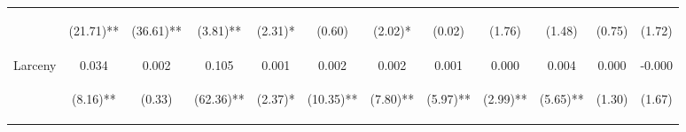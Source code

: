 \begin{tabular}{lccccccccccc}
 & \begin{footnotesize}(21.71)**\end{footnotesize} & \begin{footnotesize}(36.61)**\end{footnotesize} & \begin{footnotesize}(3.81)**\end{footnotesize} & \begin{footnotesize}(2.31)*\end{footnotesize} & \begin{footnotesize}(0.60)\end{footnotesize} & \begin{footnotesize}(2.02)*\end{footnotesize} & \begin{footnotesize}(0.02)\end{footnotesize} & \begin{footnotesize}(1.76)\end{footnotesize} & \begin{footnotesize}(1.48)\end{footnotesize} & \begin{footnotesize}(0.75)\end{footnotesize} & \begin{footnotesize}(1.72)\end{footnotesize}\\
\noalign{\smallskip}Larceny & 0.034 & 0.002 & 0.105 & 0.001 & 0.002 & 0.002 & 0.001 & 0.000 & 0.004 & 0.000 & -0.000\\
 & \begin{footnotesize}(8.16)**\end{footnotesize} & \begin{footnotesize}(0.33)\end{footnotesize} & \begin{footnotesize}(62.36)**\end{footnotesize} & \begin{footnotesize}(2.37)*\end{footnotesize} & \begin{footnotesize}(10.35)**\end{footnotesize} & \begin{footnotesize}(7.80)**\end{footnotesize} & \begin{footnotesize}(5.97)**\end{footnotesize} & \begin{footnotesize}(2.99)**\end{footnotesize} & \begin{footnotesize}(5.65)**\end{footnotesize} & \begin{footnotesize}(1.30)\end{footnotesize} & \begin{footnotesize}(1.67)\end{footnotesize}\\

\end{tabular}
